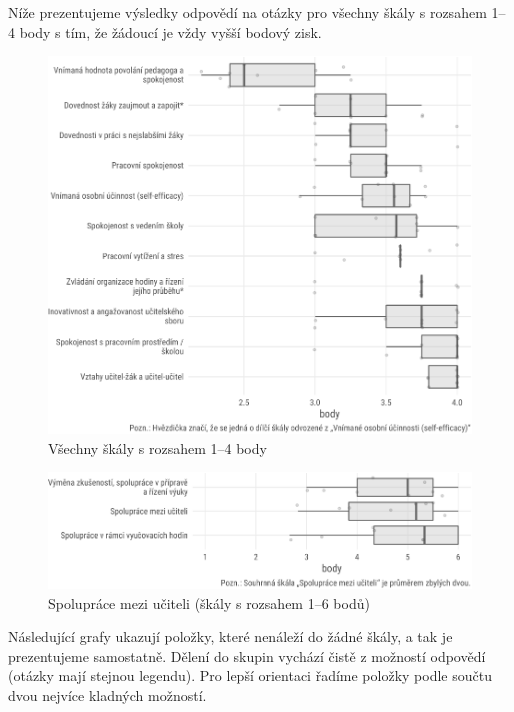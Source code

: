 \documentclass[12pt,a4paper,]{report}
\begin{document}
Níže prezentujeme výsledky odpovědí na otázky pro všechny škály s rozsahem 1--4 body s tím, že žádoucí je vždy vyšší bodový zisk.

\begin{figure}

{\centering \includegraphics[width=\textwidth]{figs/scales1to4-1}

}

\caption{Všechny škály s rozsahem 1--4 body}\label{fig:scales1to4}
\end{figure}

\begin{figure}

{\centering \includegraphics[width=\textwidth]{figs/scales1to6-1}

}

\caption{Spolupráce mezi učiteli (škály s rozsahem 1--6 bodů)}\label{fig:scales1to6}
\end{figure}

\newpage

Následující grafy ukazují položky, které nenáleží do žádné škály, a tak je prezentujeme samostatně. Dělení do skupin vychází čistě z možností odpovědí (otázky mají stejnou legendu). Pro lepší orientaci řadíme položky podle součtu dvou nejvíce kladných možností.
\end{document}
